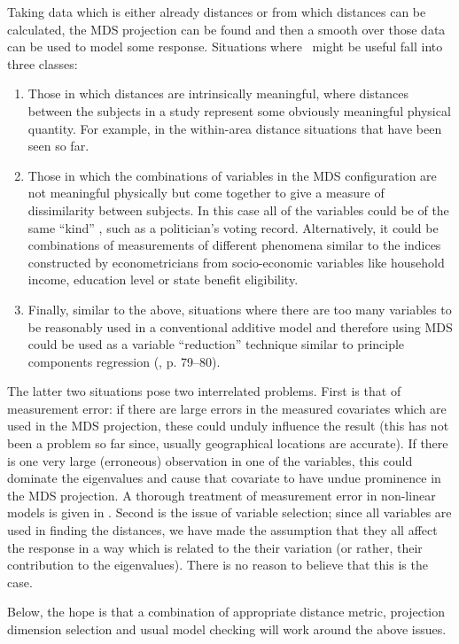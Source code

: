 Taking data which is either already distances or from which distances can be calculated, the MDS projection can be found and then a smooth over those data can be used to model some response. Situations where \mdsds\ might be useful fall into three classes: 
\begin{enumerate}
\item Those in which distances are intrinsically meaningful, where distances between the subjects in a study represent some obviously meaningful physical quantity. For example, in the within-area distance situations that have been seen so far.
\item Those in which the combinations of variables in the MDS configuration are not meaningful physically but come together to give a measure of dissimilarity between subjects. In this case all of the variables could be of the same ``kind'' , such as a politician's voting record. Alternatively, it could be combinations of measurements of different phenomena similar to the indices constructed by econometricians from socio-economic variables like household income, education level or state benefit eligibility.
\item Finally, similar to the above, situations where there are too many variables to be reasonably used in a conventional additive model and therefore using MDS could be used as a variable ``reduction'' technique similar to principle components regression (\cite{elements}, p. 79--80).
\end{enumerate}
The latter two situations pose two interrelated problems. First is that of measurement error: if there are large errors in the measured covariates which are used in the MDS projection, these could unduly influence the result (this has not been a problem so far since, usually geographical locations are accurate). If there is one very large (erroneous) observation in one of the variables, this could dominate the eigenvalues and cause that covariate to have undue prominence in the MDS projection. A thorough treatment of measurement error in non-linear models is given in . Second is the issue of variable selection; since all variables are used in finding the distances, we have made the assumption that they all affect the response in a way which is related to the their variation (or rather, their contribution to the eigenvalues). There is no reason to believe that this is the case.

Below, the hope is that a combination of appropriate distance metric, projection dimension selection and usual model checking will work around the above issues.

